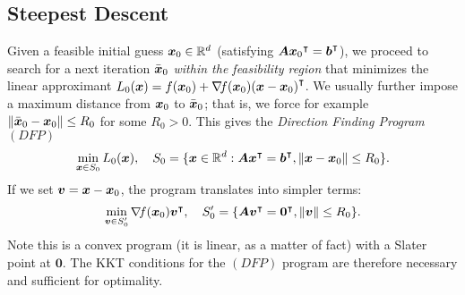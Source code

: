 \subsection{Steepest Descent}
Given a feasible initial guess $\boldsymbol{x}_0 \in \mathbb{R}^d$ (satisfying $\boldsymbol{A}{\boldsymbol{x}_0}^\intercal={\boldsymbol{b}}^\intercal$), we proceed to search for a next iteration $\bar{\boldsymbol{x}}_0$ \emph{within the feasibility region} that minimizes the linear approximant $L_0(\boldsymbol{x}) = f(\boldsymbol{x}_0) + \mathop{\nabla\! {f}}(\boldsymbol{x}_0){(\boldsymbol{x}-\boldsymbol{x}_0)}^\intercal$.  We usually further impose a maximum distance from $\boldsymbol{x}_0$ to $\bar{\boldsymbol{x}}_0$; that is, we force for example $\lVert \bar{\boldsymbol{x}}_0 - \boldsymbol{x}_0 \rVert \leq R_0$ for some $R_0>0$.  This gives the \emph{Direction Finding Program} $(DFP)$
\begin{equation*}
\min_{\boldsymbol{x} \in S_0}L_0(\boldsymbol{x}), \quad S_0=\{ \boldsymbol{x} \in \mathbb{R}^d :  \boldsymbol{A}{\boldsymbol{x}}^\intercal={\boldsymbol{b}}^\intercal, \lVert \boldsymbol{x}-\boldsymbol{x}_0 \rVert \leq R_0 \}.
\end{equation*}
If we set $\boldsymbol{v} = \boldsymbol{x} - \boldsymbol{x}_0$, the program translates into simpler terms:
\begin{equation*}
\min_{\boldsymbol{v} \in S_0'} \mathop{\nabla\! {f}}(\boldsymbol{x}_0){\boldsymbol{v}}^\intercal, \quad S_0' = \{ \boldsymbol{A}{\boldsymbol{v}}^\intercal = {\boldsymbol{0}}^\intercal, \lVert \boldsymbol{v} \rVert \leq R_0 \}.
\end{equation*}
Note this is a convex program (it is linear, as a matter of fact) with a Slater point at $\boldsymbol{0}$.  The KKT conditions for the $(DFP)$ program are therefore necessary and sufficient for optimality. 

